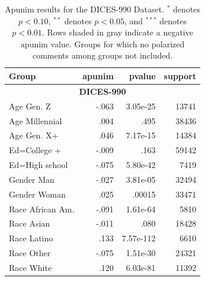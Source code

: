 \documentclass{article} %
\theoremstyle{definition}
\theoremstyle{plain}
\begin{document}
\begin{table}[t]
	\centering
	\small 
	\begin{tabularx}{\columnwidth}{X r r r}
		\toprule
		\textbf{Group} & \textbf{apunim} & \textbf{pvalue} & \textbf{support} \\
		\midrule
		
		\multicolumn{4}{c}{\textbf{DICES-990}} \\
		\midrule
		\rowcolor{gray!15}
		Age Gen. Z & -.063 & 3.05e-25 & 13741 \\
		Age Millennial & .004 & .495 & 38436 \\
		Age Gen. X+ & .046 & 7.17e-15 & 14384 \\
		\rowcolor{gray!15}
		Ed=College + & -.009 & .163 & 59142 \\
		\rowcolor{gray!15}
		Ed=High school & -.075 & 5.80e-42 & 7419 \\
		\rowcolor{gray!15}
		Gender Man & -.027 & 3.81e-05 & 32494 \\
		Gender Woman & .025 & .00015 & 33471 \\
		\rowcolor{gray!15}
		Race African Am. & -.091 & 1.61e-64 & 5810 \\
		\rowcolor{gray!15}
		Race Asian & -.011 & .080 & 18428 \\
		Race Latino & .133 & 7.57e-112 & 6610 \\
		\rowcolor{gray!15}
		Race Other & -.075 & 1.51e-30 & 24321 \\
		Race White & .120 & 6.03e-81 & 11392 \\
		\bottomrule
	\end{tabularx}
	\caption{Apunim results for the DICES-990 Dataset. $^{*}$ denotes $p<0.10$, $^{**}$ denotes $p<0.05$, and $^{***}$ denotes $p<0.01$.  Rows shaded in gray indicate a negative $\text{apunim}$ value. Groups for which no polarized comments among groups not included.}
	\label{tab:dices990-full}
\end{table}
\end{document}
